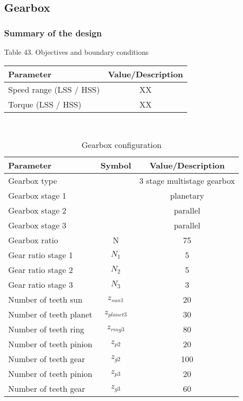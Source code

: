 \subsection{Gearbox}

\subsubsection{Summary of the design}

\begin{center}
Table 43. Objectives and boundary conditions\\
\begin{tabular}{ |l|c| } 
\hline
\textbf{Parameter} & \textbf{Value/Description}  \\ 
\hline
Speed range (LSS / HSS) & XX  \\ 
\hline
Torque (LSS / HSS) & XX \\
\hline
\end{tabular} \\
\end{center}

\begin{table}[h]
\centering
\caption{Gearbox configuration}
\label{tab:gearbox_config}
\begin{tabular}{ |l|c|c| } 
\hline
\textbf{Parameter} & \textbf{Symbol} & \textbf{Value/Description}\\ 
\hline
Gearbox type & & 3 stage multistage gearbox\\
Gearbox stage 1 & & planetary\\
Gearbox stage 2 & & parallel\\
Gearbox stage 3 & & parallel\\
Gearbox ratio & N & 75 \\
Gear ratio stage 1 & $N_1$ & 5\\
Gear ratio stage 2 & $N_2$ & 5\\
Gear ratio stage 3 & $N_3$ & 3\\
Number of teeth sun& $z_{sun1}$ & 20\\
Number of teeth planet& $z_{planet3}$ & 30\\
Number of teeth ring& $z_{ring3}$ & 80\\
Number of teeth pinion& $z_{p2}$ & 20\\
Number of teeth gear& $z_{g2}$ & 100\\
Number of teeth pinion& $z_{p3}$ & 20\\
Number of teeth gear& $z_{g3}$ & 60\\
\hline
\end{tabular} \\
\end{table}

